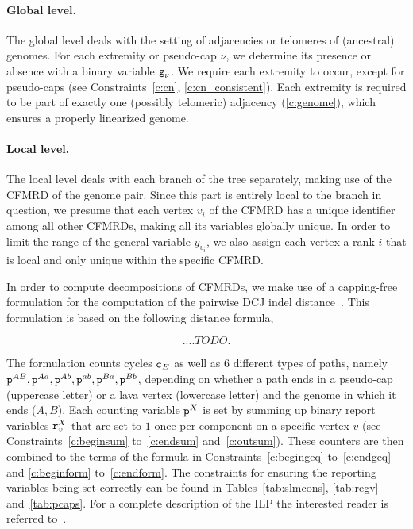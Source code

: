 \documentclass[runningheads]{llncs}
\begin{document}
\paragraph{Global level.} 
The global level deals with the setting of adjacencies or telomeres of (ancestral) genomes. For each extremity or pseudo-cap $\nu$, we determine its presence or absence with a binary variable ${\texttt{g}}_\nu$. We require each extremity to occur, except for pseudo-caps (see Constraints~\ref{c:cn}, \ref{c:cn_consistent}). Each extremity is required to be part of exactly one (possibly telomeric) adjacency (\ref{c:genome}), which ensures a properly linearized genome.

\paragraph{Local level.}
The local level deals with each branch of the tree separately, making use of the CFMRD of the genome pair. Since this part is entirely local to the branch in question, we presume that each vertex $v_i$ of the CFMRD has a unique identifier among all other CFMRDs, making all its variables globally unique. In order to limit the range of the general variable $y_{v_i}$, we also assign each vertex a rank $i$ that is local and only unique within the specific CFMRD.

In order to compute decompositions of CFMRDs, we make use of a capping-free formulation for the computation of the pairwise DCJ indel distance~\cite{BOH-2024}. This formulation is based on the following distance formula,

\begin{equation}
	.... TODO.
\end{equation}

The formulation counts cycles ${\texttt{c}}_E$ as well as 6 different types of paths, namely ${\texttt{p}}^{AB},{\texttt{p}}^{Aa},{\texttt{p}}^{Ab},{\texttt{p}}^{ab},{\texttt{p}}^{Ba},{\texttt{p}}^{Bb}$, depending on whether a path ends in a pseudo-cap (uppercase letter) or a lava vertex (lowercase letter) and the genome in which it ends ($A,B$). Each counting variable ${\texttt{p}}^X$ is set by summing up binary report variables ${\texttt{r}}^X_v$ that are set to $1$ once per component on a specific vertex $v$ (see Constraints~\ref{c:beginsum} to~\ref{c:endsum} and~\ref{c:outsum}). These counters are then combined to the terms of the formula in Constraints~\ref{c:begingeq} to~\ref{c:endgeq} and \ref{c:beginform} to~\ref{c:endform}. The constraints for ensuring the reporting variables being set correctly can be found in Tables~\ref{tab:slmcons}, \ref{tab:regv} and~\ref{tab:pcaps}. For a complete description of the ILP the interested reader is referred to~\cite{BOH-2024}.
\end{document}
